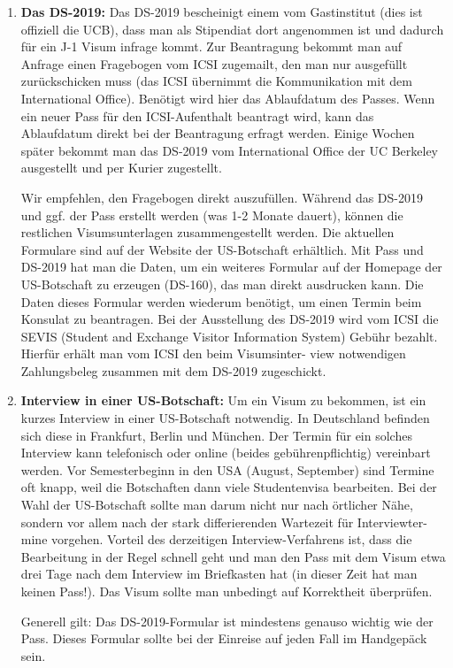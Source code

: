 \documentclass[a4paper]{scrreprt}
\begin{document}
\begin{enumerate}
	\item \textbf{Das DS-2019:} Das DS-2019 bescheinigt einem vom Gastinstitut (dies ist offiziell die UCB), dass man als Stipendiat dort angenommen ist und dadurch für ein J-1 Visum infrage kommt. Zur Beantragung bekommt man auf Anfrage einen Fragebogen vom ICSI zugemailt, den man nur ausgefüllt zurückschicken muss (das ICSI übernimmt die Kommunikation mit dem International Office). Benötigt wird hier das Ablaufdatum des Passes. Wenn ein neuer Pass für den ICSI-Aufenthalt beantragt wird, kann das Ablaufdatum direkt bei der Beantragung erfragt werden. Einige Wochen später bekommt man das DS-2019 vom International Office der UC Berkeley ausgestellt und per Kurier zugestellt.
	
	Wir empfehlen, den Fragebogen direkt auszufüllen. Während das DS-2019 und ggf. der Pass erstellt werden (was 1-2 Monate dauert), können die restlichen Visumsunterlagen zusammengestellt werden. Die aktuellen Formulare sind auf der Website der US-Botschaft erhältlich. Mit Pass und DS-2019 hat man die Daten, um ein weiteres Formular auf der Homepage der US-Botschaft zu erzeugen (DS-160), das man direkt ausdrucken kann. Die Daten dieses Formular werden wiederum benötigt, um einen Termin beim Konsulat zu beantragen. Bei der Ausstellung des DS-2019 wird vom ICSI die SEVIS (Student and Exchange Visitor Information System) Gebühr bezahlt. Hierfür erhält man vom ICSI den beim Visumsinter- view notwendigen Zahlungsbeleg zusammen mit dem DS-2019 zugeschickt.

	\item \textbf{Interview in einer US-Botschaft:} Um ein Visum zu bekommen, ist ein kurzes Interview in einer US-Botschaft notwendig. In Deutschland befinden sich diese in Frankfurt, Berlin und München. Der Termin für ein solches Interview kann telefonisch oder online (beides gebührenpflichtig) vereinbart werden. Vor Semesterbeginn in den USA (August, September) sind Termine oft knapp, weil die Botschaften dann viele Studentenvisa bearbeiten. Bei der Wahl der US-Botschaft sollte man darum nicht nur nach örtlicher Nähe, sondern vor allem nach der stark differierenden Wartezeit für Interviewter- mine vorgehen. Vorteil des derzeitigen Interview-Verfahrens ist, dass die Bearbeitung in der Regel schnell geht und man den Pass mit dem Visum etwa drei Tage nach dem Interview im Briefkasten hat (in dieser Zeit hat man keinen Pass!). Das Visum sollte man unbedingt auf Korrektheit überprüfen.
	
	Generell gilt: Das DS-2019-Formular ist mindestens genauso wichtig wie der Pass. Dieses Formular sollte bei der
Einreise auf jeden Fall im Handgepäck sein.
	

\end{enumerate}
\end{document}
